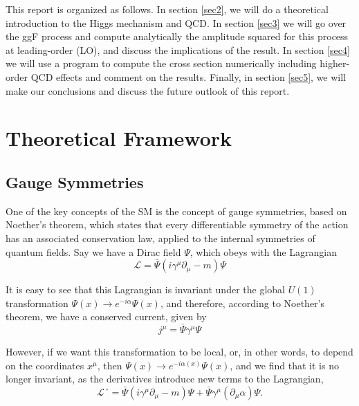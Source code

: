 \documentclass[EPJ,twocolumn]{webofc}
\begin{document}
This report is organized as follows. In section \ref{sec2}, we will do a theoretical introduction to the Higgs mechanism and QCD. In section \ref{sec3} we will go over the ggF process and compute analytically the amplitude squared for this process at leading-order (LO), and discuss the implications of the result. In section \ref{sec4} we will use a program to compute the cross section numerically including higher-order QCD effects and comment on the results. Finally, in section \ref{sec5}, we will make our conclusions and discuss the future outlook of this report.


\section{\label{sec2}Theoretical Framework}

\subsection*{Gauge Symmetries}
One of the key concepts of the SM is the concept of gauge symmetries, based on Noether's theorem, which states that every differentiable symmetry of the action has an associated conservation law, applied to the internal symmetries of quantum fields.
Say we have a Dirac field $\Psi$, which obeys with the Lagrangian
\begin{equation}
    \mathcal{L} = \bar{\Psi}\left(i\gamma^{\mu}\partial_{\mu}-m\right)\Psi
\end{equation}

It is easy to see that this Lagrangian is invariant under the global $U(1)$ transformation $\Psi(x)\rightarrow e^{-i\alpha}\Psi(x)$, and therefore, according to Noether's theorem, we have a conserved current, given by
\begin{equation}
    j^{\mu} = \bar{\Psi}\gamma^{\mu}\Psi
\end{equation}

However, if we want this transformation to be local, or, in other words, to depend on the coordinates $x^{\mu}$, then $\Psi(x)\rightarrow e^{-i\alpha(x)}\Psi(x)$, and we find that it is no longer invariant, as the derivatives introduce new terms to the Lagrangian,
\begin{equation}
    \mathcal{L}´ = \bar{\Psi}\left(i\gamma^{\mu}\partial_{\mu}-m\right)\Psi+\bar{\Psi}\gamma^{\mu}\left(\partial_{\mu}\alpha\right)\Psi.
\end{equation}
\end{document}
